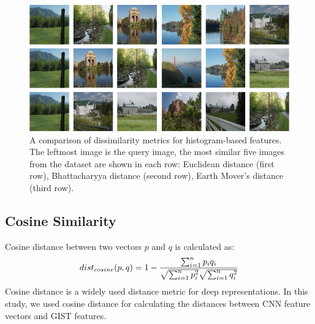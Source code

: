\begin{figure} 
\centering
\caption{A comparison of dissimilarity metrics for histogram-based features. The leftmost image is the query image, the most similar five images from the dataset are shown in each row: Euclidean distance (first row), Bhattacharyya distance (second row), Earth Mover’s distance (third row).}
\label{fig:sim_comp}
\includegraphics[width=\textwidth]{figures/chapter2/16sims.png}
\vspace{10pt}
\end{figure}

\subsection{Cosine Similarity}
Cosine distance between two vectors $p$ and $q$ is calculated as:
\begin{equation}
dist_{cosine}(p,q) = 1 - {{\sum_{i=1}^{n}p_{i}q_{i}} \over {\sqrt{\sum_{i=1}^{n}p_{i}^2}} \sqrt{\sum_{i=1}^{n}q_{i}^2}} 
\end{equation}
Cosine distance is a widely used distance metric for deep representations. In this study, we used cosine distance for calculating the distances between CNN feature vectors and GIST features.
























